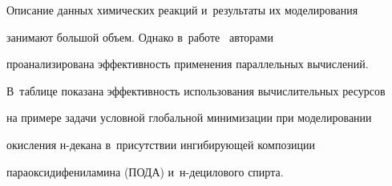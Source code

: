   


  Описание данных химических реакций и~результаты их моделирования 


занимают большой объем. Однако в~работе~\cite{7-en} авторами 


проанализирована эффективность применения параллельных вычислений. 


В~таблице показана эффективность использования вычислительных ресурсов 


на примере задачи условной глобальной минимизации при моделировании 


окисления н-де\-ка\-на в~присутствии ингибирующей композиции 


параоксидифениламина (ПОДА) и~н-де\-ци\-ло\-во\-го спирта.


  


